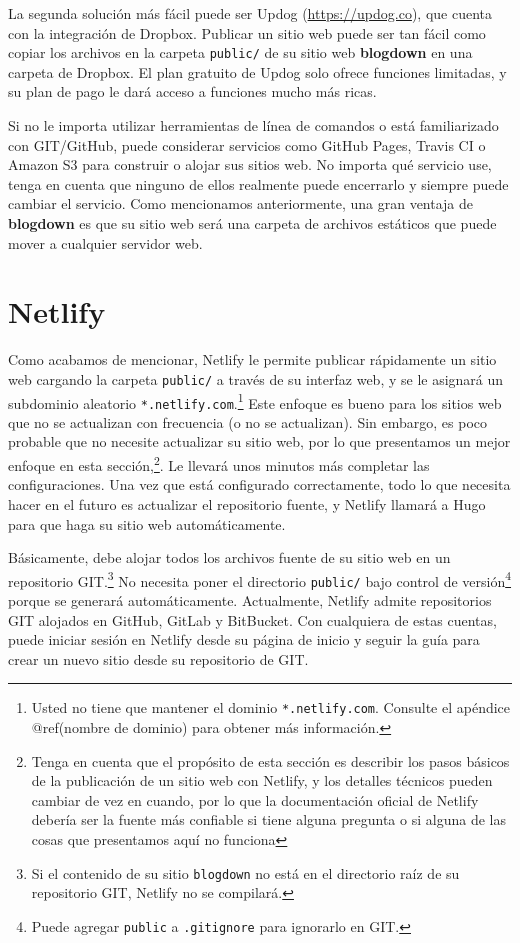 \documentclass[12pt,]{krantz}
\theoremstyle{definition}
\theoremstyle{definition}
\theoremstyle{definition}
\theoremstyle{remark}
\begin{document}
La segunda solución más fácil puede ser Updog (\url{https://updog.co}),
que cuenta con la integración de Dropbox. Publicar un sitio web puede
ser tan fácil como copiar los archivos en la carpeta \texttt{public/} de
su sitio web \textbf{blogdown} en una carpeta de Dropbox. El plan
gratuito de Updog solo ofrece funciones limitadas, y su plan de pago le
dará acceso a funciones mucho más ricas.

Si no le importa utilizar herramientas de línea de comandos o está
familiarizado con GIT/GitHub, puede considerar servicios como GitHub
Pages, Travis CI o Amazon S3 para construir o alojar sus sitios web. No
importa qué servicio use, tenga en cuenta que ninguno de ellos realmente
puede encerrarlo y siempre puede cambiar el servicio. Como mencionamos
anteriormente, una gran ventaja de \textbf{blogdown} es que su sitio web
será una carpeta de archivos estáticos que puede mover a cualquier
servidor web.

\hypertarget{netlify}{%
\section{Netlify}\label{netlify}}

Como acabamos de mencionar, Netlify le permite publicar
rápidamente un sitio web cargando la carpeta \texttt{public/} a través
de su interfaz web, y se le asignará un subdominio aleatorio
\texttt{*.netlify.com}.\footnote{Usted no tiene que mantener el dominio
  \texttt{*.netlify.com}. Consulte el apéndice @ref(nombre de dominio)
  para obtener más información.} Este enfoque es bueno para los sitios
web que no se actualizan con frecuencia (o no se actualizan). Sin
embargo, es poco probable que no necesite actualizar su sitio web, por
lo que presentamos un mejor enfoque en esta sección,\footnote{Tenga en
  cuenta que el propósito de esta sección es describir los pasos básicos
  de la publicación de un sitio web con Netlify, y los detalles técnicos
  pueden cambiar de vez en cuando, por lo que la documentación oficial
  de Netlify debería ser la fuente más confiable si tiene alguna
  pregunta o si alguna de las cosas que presentamos aquí no funciona}.
Le llevará unos minutos más completar las configuraciones. Una vez que
está configurado correctamente, todo lo que necesita hacer en el futuro
es actualizar el repositorio fuente, y Netlify llamará a Hugo para que
haga su sitio web automáticamente.

Básicamente, debe alojar todos los archivos fuente de su sitio web en un
repositorio GIT.\footnote{Si el contenido de su sitio \texttt{blogdown}
  no está en el directorio raíz de su repositorio GIT, Netlify no se
  compilará.} No necesita poner el directorio \texttt{public/} bajo
control de versión\footnote{Puede agregar \texttt{public} a
  \texttt{.gitignore} para ignorarlo en GIT.} porque se generará
automáticamente. Actualmente, Netlify admite repositorios GIT alojados
en GitHub, GitLab y BitBucket. Con cualquiera de estas cuentas, puede
iniciar sesión en Netlify desde su página de inicio y seguir la guía
para crear un nuevo sitio desde su repositorio de GIT.
\end{document}
